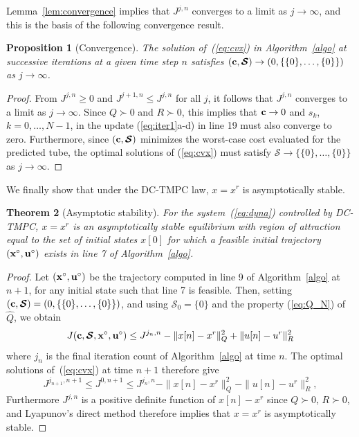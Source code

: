 \documentclass[a4paper, 10 pt, conference]{IEEEconf}
\newtheorem{theorem}{Theorem}
\newtheorem{proposition}[theorem]{Proposition}
\def\S{\mathcal{S}}
\def\bc{{\bf c}}
\def\bS{\boldsymbol{\mathcal{S}}}
\begin{document}
Lemma~\ref{lem:convergence} implies that $J^{j,n}$ converges to a limit as $j\to\infty$, and this is the basis of the following convergence result.

\begin{proposition}[Convergence]\label{prop:convergence}
The solution of~(\ref{eq:cvx}) in Algorithm~\ref{algo} at successive iterations at a given time step $n$ satisfies $(\bc,\bS) \to (0,\{\{0\},\ldots,\{0\}\})$ as ${j\to\infty}$.
\end{proposition}

\begin{proof}
From 
$J^{j,n} \geq 0$ and $J^{j+1,n} \leq J^{j,n}$ for all $j$, it follows that $J^{j,n}$ converges to a limit as $j\to\infty$. Since $Q\succ 0$ and $R\succ 0$, this implies that $\bc \to 0$ and $s_k$, $k=0,\ldots,N-1$, in the update (\ref{eq:iter1}a-d) in line 19 must also converge to zero.
Furthermore, since $(\bc,\bS)$ minimizes the worst-case cost evaluated for the predicted tube, the optimal solutions of (\ref{eq:cvx}) must satisfy $\bS \to \{\{0\},\ldots,\{0\}\}$ as $j\to\infty$.
%
\end{proof}



We finally show that under the DC-TMPC law, $x=x^r$ is asymptotically stable. 

\begin{theorem}[Asymptotic stability] 
For the system~(\ref{eq:dyna}) controlled by DC-TMPC, $x=x^r$ is an asymptotically stable equilibrium with region of attraction equal to the set of initial states $x[0]$ for which a feasible initial trajectory $({\bf x}^\circ,{\bf u}^\circ)$ exists in line 7 of Algorithm~\ref{algo}.
\end{theorem}

\begin{proof}
Let $({\bf x}^\circ,{\bf u}^\circ)$ be the trajectory computed in line 9  of Algorithm~\ref{algo} at $n+1$, for any initial state such that line 7 is feasible. Then, setting $(\bc,\bS) = (0,\{\{0\},\ldots,\{0\}\})$, and using $\S_0=\{0\}$ and the property (\ref{eq:Q_N}) of $\hat{Q}$, we obtain 
\[
J(\bc,\bS,{\bf x}^\circ,{\bf u}^\circ) \leq J^{j_{n},n} - \|x[n] - x^r\|_Q^2 + \|u[n] - u^r\|_R^2
\]
where $j_{n}$ is the final iteration count of Algorithm~\ref{algo} at time $n$. The optimal solutions of~(\ref{eq:cvx}) at time $n+1$ therefore give
\[
J^{j_{n+1},n+1}\leq J^{0,n+1}\leq J^{j_n,n} - \|x[n] - x^r\|_Q^2 - \|u[n] - u^r\|_R^2 ,
\]
Furthermore $J^{j,n}$ is a positive definite function of $x[n] - x^r$ since $Q\succ 0$, $R\succ 0$, and Lyapunov's direct method therefore implies that $x=x^r$ is asymptotically stable.
\end{proof}
\end{document}
